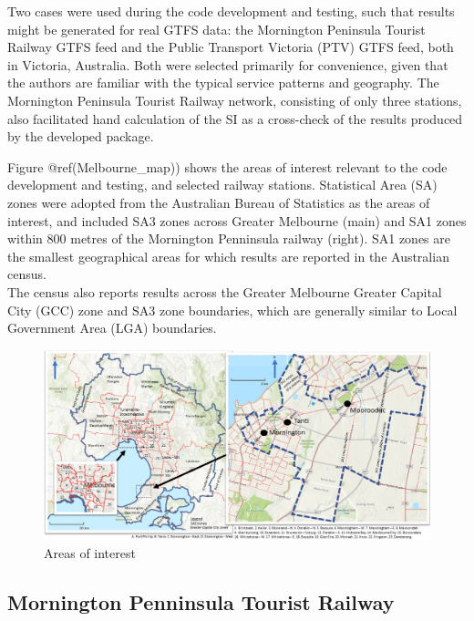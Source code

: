 \documentclass[preprint, 3p,
authoryear]{elsarticle} %
\begin{document}
Two cases were used during the code development and testing, such that
results might be generated for real GTFS data: the Mornington Peninsula
Tourist Railway GTFS feed and the Public Transport Victoria (PTV) GTFS
feed, both in Victoria, Australia. Both were selected primarily for
convenience, given that the authors are familiar with the typical
service patterns and geography. The Mornington Peninsula Tourist Railway
network, consisting of only three stations, also facilitated hand
calculation of the SI as a cross-check of the results produced by the
developed package.

Figure @ref(Melbourne\_map)) shows the areas of interest relevant to the
code development and testing, and selected railway stations. Statistical
Area (SA) zones were adopted from the Australian Bureau of Statistics
\citep{ABSmaps} as the areas of interest, and included SA3 zones across
Greater Melbourne (main) and SA1 zones within 800 metres of the
Mornington Penninsula railway (right). SA1 zones are the smallest
geographical areas for which results are reported in the Australian
census.\\
The census also reports results across the Greater Melbourne Greater
Capital City (GCC) zone and SA3 zone boundaries, which are generally
similar to Local Government Area (LGA) boundaries.

\begin{figure}
\includegraphics[width=1\linewidth]{graphics/all_maps} \caption{Areas of interest}\label{fig:Melbourne_map}
\end{figure}

\hypertarget{mornington-penninsula-tourist-railway}{%
\subsection{Mornington Penninsula Tourist
Railway}\label{mornington-penninsula-tourist-railway}}
\end{document}
